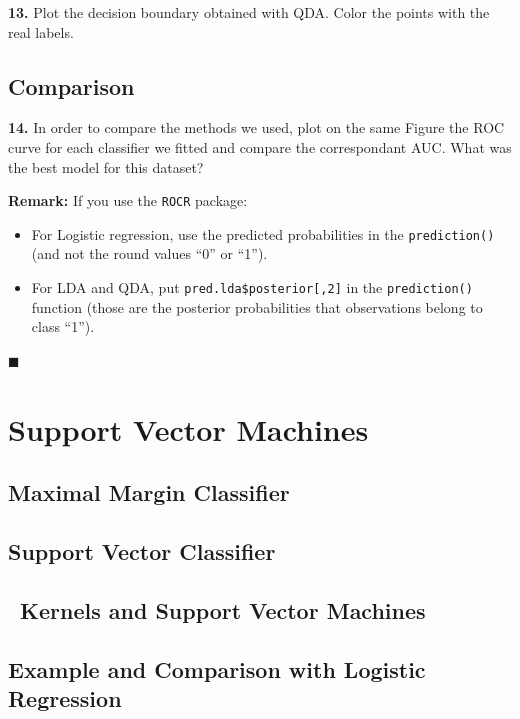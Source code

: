 \documentclass[]{book}
\providecommand{\tightlist}{%
  \setlength{\itemsep}{0pt}\setlength{\parskip}{0pt}}
\begin{document}
\textbf{13.} Plot the decision boundary obtained with QDA. Color the
points with the real labels.

\section*{Comparison}\label{comparison}

\textbf{14.} In order to compare the methods we used, plot on the same
Figure the ROC curve for each classifier we fitted and compare the
correspondant AUC. What was the best model for this dataset?

\textbf{Remark:} If you use the \texttt{ROCR} package:

\begin{itemize}
\tightlist
\item
  For Logistic regression, use the predicted probabilities in the
  \texttt{prediction()} (and not the round values ``0'' or ``1'').
\item
  For LDA and QDA, put \texttt{pred.lda\$posterior{[},2{]}} in the
  \texttt{prediction()} function (those are the posterior probabilities
  that observations belong to class ``1'').
\end{itemize}

◼

\chapter{Support Vector Machines}\label{support-vector-machines}

\section{Maximal Margin Classifier}\label{maximal-margin-classifier}

\section{Support Vector Classifier}\label{support-vector-classifier}

\section{~Kernels and Support Vector
Machines}\label{kernels-and-support-vector-machines}

\section{Example and Comparison with Logistic
Regression}\label{example-and-comparison-with-logistic-regression}
\end{document}
